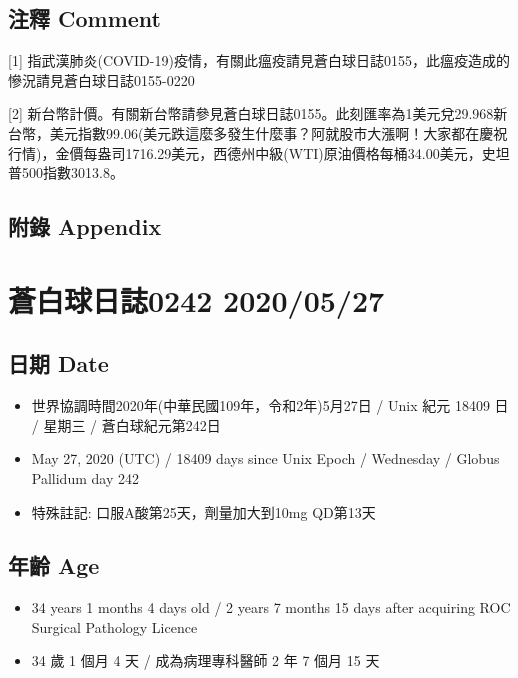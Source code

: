 \documentclass[a5paper, 11pt
]{book}
\providecommand{\tightlist}{%
  \setlength{\itemsep}{0pt}\setlength{\parskip}{0pt}}
\begin{document}
\hypertarget{ux6ce8ux91cb-comment-86}{%
\subsection{注釋 Comment}\label{ux6ce8ux91cb-comment-86}}

{[}1{]}
指武漢肺炎(COVID-19)疫情，有關此瘟疫請見蒼白球日誌0155，此瘟疫造成的慘況請見蒼白球日誌0155-0220

{[}2{]}
新台幣計價。有關新台幣請參見蒼白球日誌0155。此刻匯率為1美元兌29.968新台幣，美元指數99.06(美元跌這麼多發生什麼事？阿就股市大漲啊！大家都在慶祝行情)，金價每盎司1716.29美元，西德州中級(WTI)原油價格每桶34.00美元，史坦普500指數3013.8。

\hypertarget{ux9644ux9304-appendix-86}{%
\subsection{附錄 Appendix}\label{ux9644ux9304-appendix-86}}

\hypertarget{ux84bcux767dux7403ux65e5ux8a8c0242-20200527}{%
\section{蒼白球日誌0242
2020/05/27}\label{ux84bcux767dux7403ux65e5ux8a8c0242-20200527}}

\hypertarget{ux65e5ux671f-date-87}{%
\subsection{日期 Date}\label{ux65e5ux671f-date-87}}

\begin{itemize}
\tightlist
\item
  世界協調時間2020年(中華民國109年，令和2年)5月27日 / Unix 紀元 18409 日
  / 星期三 / 蒼白球紀元第242日
\item
  May 27, 2020 (UTC) / 18409 days since Unix Epoch / Wednesday / Globus
  Pallidum day 242
\item
  特殊註記: 口服A酸第25天，劑量加大到10mg QD第13天
\end{itemize}

\hypertarget{ux5e74ux9f61-age-87}{%
\subsection{年齡 Age}\label{ux5e74ux9f61-age-87}}

\begin{itemize}
\tightlist
\item
  34 years 1 months 4 days old / 2 years 7 months 15 days after
  acquiring ROC Surgical Pathology Licence
\item
  34 歲 1 個月 4 天 / 成為病理專科醫師 2 年 7 個月 15 天
\end{itemize}
\end{document}
